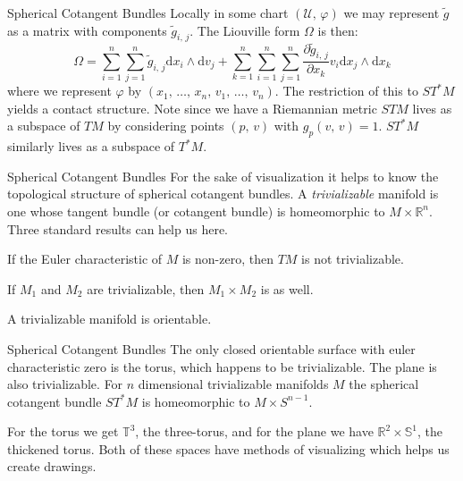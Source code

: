 \documentclass{beamer}
\begin{document}
    \begin{frame}{Spherical Cotangent Bundles}
        Locally in some chart $(\mathcal{U},\,\varphi)$ we may represent
        $\tilde{g}$ as a matrix with components $\tilde{g}_{i,\,j}$. The
        Liouville form $\Omega$ is then:
        \begin{equation}
            \Omega=\sum_{i=1}^{n}\sum_{j=1}^{n}
                \tilde{g}_{i,\,j}\textrm{d}x_{i}\land\textrm{d}v_{j}+
            \sum_{k=1}^{n}\sum_{i=1}^{n}\sum_{j=1}^{n}
                \frac{\partial\tilde{g}_{i,\,j}}{\partial{x}_{k}}
                v_{i}\textrm{d}x_{j}\land\textrm{d}x_{k}
        \end{equation}
        where we represent $\varphi$ by
        $(x_{1},\,\dots,\,x_{n},\,v_{1},\,\dots,\,v_{n})$. The restriction of
        this to $ST^{*}M$ yields a contact structure. Note since we have a
        Riemannian metric $STM$ lives as a subspace of $TM$ by
        considering points $(p,\,v)$ with $g_{p}(v,\,v)=1$. $ST^{*}M$ similarly
        lives as a subspace of $T^{*}M$.
    \end{frame}
    \begin{frame}{Spherical Cotangent Bundles}
        For the sake of visualization it helps to know the topological
        structure of spherical cotangent bundles. A \textit{trivializable}
        manifold is one whose tangent bundle (or cotangent bundle) is
        homeomorphic to $M\times\mathbb{R}^{n}$.
        Three standard results can help us here.
        \begin{theorem}
            If the Euler characteristic of $M$ is non-zero, then $TM$ is not
            trivializable.
        \end{theorem}
        \begin{theorem}
            If $M_{1}$ and $M_{2}$ are trivializable, then
            $M_{1}\times{M}_{2}$ is as well.
        \end{theorem}
        \begin{theorem}
            A trivializable manifold is orientable.
        \end{theorem}
    \end{frame}
    \begin{frame}{Spherical Cotangent Bundles}
        The only closed orientable surface with euler characteristic zero is
        the torus, which happens to be trivializable. The plane is also
        trivializable. For $n$ dimensional trivializable manifolds $M$ the
        spherical cotangent bundle $ST^{*}M$ is homeomorphic to
        $M\times{S}^{n-1}$.
        \par\hfill\par
        For the torus we get $\mathbb{T}^{3}$, the
        three-torus, and for the plane we have
        $\mathbb{R}^{2}\times\mathbb{S}^{1}$, the thickened torus. Both of these
        spaces have methods of visualizing which helps us create drawings.
    \end{frame}
\end{document}
